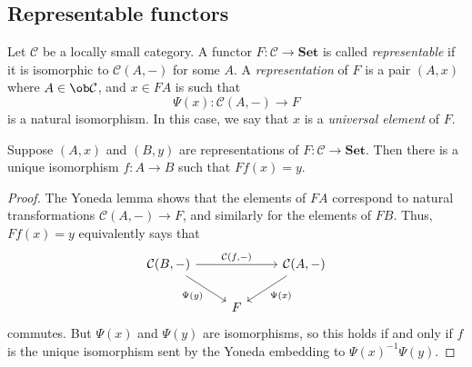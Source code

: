 \subsection{Representable functors}
\begin{definition}
    Let \( \mathcal C \) be a locally small category.
    A functor \( F : \mathcal C \to \mathbf{Set} \) is called \emph{representable} if it is isomorphic to \( \mathcal C(A, -) \) for some \( A \).
    A \emph{representation} of \( F \) is a pair \( (A, x) \) where \( A \in \ob \mathcal C \), and \( x \in FA \) is such that
    \[ \Psi(x) : \mathcal C(A, -) \to F \]
    is a natural isomorphism.
    In this case, we say that \( x \) is a \emph{universal element} of \( F \).
\end{definition}
\begin{corollary}
    Suppose \( (A, x) \) and \( (B, y) \) are representations of \( F : \mathcal C \to \mathbf{Set} \).
    Then there is a unique isomorphism \( f : A \to B \) such that \( Ff(x) = y \).
\end{corollary}
\begin{proof}
    The Yoneda lemma shows that the elements of \( F A \) correspond to natural transformations \( \mathcal C(A, -) \to F \), and similarly for the elements of \( F B \).
    Thus, \( Ff(x) = y \) equivalently says that
    \[\begin{tikzcd}
        {\mathcal C(B, -)} && {\mathcal C(A, -)} \\
        & F
        \arrow["{\mathcal C(f, -)}", from=1-1, to=1-3]
        \arrow["{\Psi(x)}", from=1-3, to=2-2]
        \arrow["{\Psi(y)}"', from=1-1, to=2-2]
    \end{tikzcd}\]
    commutes.
    But \( \Psi(x) \) and \( \Psi(y) \) are isomorphisms, so this holds if and only if \( f \) is the unique isomorphism sent by the Yoneda embedding to \( \Psi(x)^{-1} \Psi(y) \).
\end{proof}
